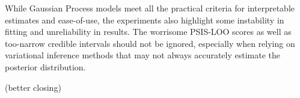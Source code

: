 While Gaussian Process models meet all the practical criteria for interpretable estimates and ease-of-use, the experiments also highlight some instability in fitting and unreliability in results. The worrisome PSIS-LOO scores as well as too-narrow credible intervals should not be ignored, especially when relying on variational inference methods that may not always accurately estimate the posterior distribution.

\todo(better closing)
